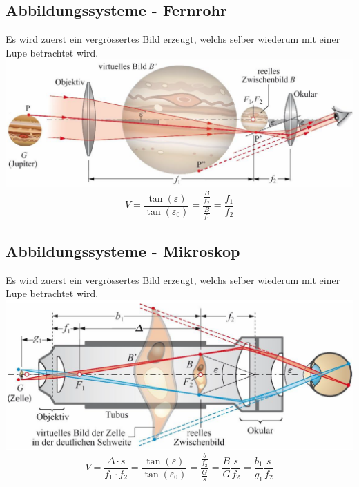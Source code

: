 \subsection{Abbildungssysteme - Fernrohr}

Es wird zuerst ein vergrössertes Bild erzeugt, welchs selber wiederum mit einer Lupe betrachtet wird. \\

\includegraphics[width=0.9\linewidth]{Bilder/Wellen-Optik/fernrohr} \\

$$ \boxed{ V = \frac{\tan(\varepsilon)}{\tan(\varepsilon_0)} = \frac{\frac{B}{f_2}}{\frac{B}{f_1} } = \frac{f_1}{f_2}  } $$




\subsection{Abbildungssysteme - Mikroskop}

Es wird zuerst ein vergrössertes Bild erzeugt, welchs selber wiederum mit einer Lupe betrachtet wird. \\

\includegraphics[width=0.9\linewidth]{Bilder/Wellen-Optik/mikroskop} \\

$$ \boxed{ V = \frac{\Delta \cdot s}{f_1 \cdot f_2} = \frac{\tan(\varepsilon)}{\tan(\varepsilon_0)} = \frac{\frac{b}{f_2}}{\frac{G}{s}} = \frac{B}{G} \frac{s}{f_2} = \frac{b_1}{g_1} \frac{s}{f_2} } $$


